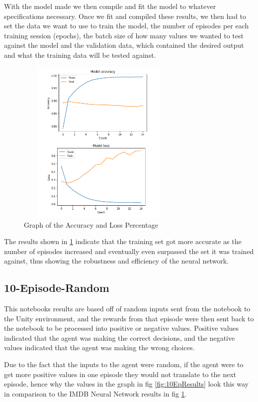 \begin{itemize}
With the model made we then compile and fit the model to whatever specifications necessary. Once we fit and compiled these results, we then had to set the data we want to use to train the model, the number of episodes per each training session (epochs), the batch size of how many values we wanted to test against the model and the validation data, which contained the desired output and what the training data will be tested against.
\begin{figure}[H]
    \centering
    \includegraphics[width=80mm, height=80mm]{img/IMBD_results.PNG}
    \caption{Graph of the Accuracy and Loss Percentage}
    \label{fig:graph-results}
\end{figure}
The results shown in \ref{fig:graph-results} indicate that the training set got more accurate as the number of episodes increased and eventually even surpassed the set it was trained against, thus showing the robustness and efficiency of the neural network.

\subsection{10-Episode-Random}
This notebooks results are based off of random inputs sent from the notebook to the Unity environment, and the rewards from that episode were then sent back to the notebook to be processed into positive or negative values. Positive values indicated that the agent was making the correct decisions, and the negative values indicated that the agent was making the wrong choices. 

Due to the fact that the inputs to the agent were random, if the agent were to get more positive values in one episode they would not translate to the next episode, hence why the values in the graph in fig \ref{fig:10EpResults} look this way in comparison to the IMDB Neural Network results in fig \ref{fig:graph-results}.


\end{itemize}
